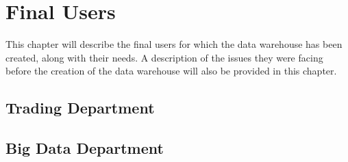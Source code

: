 \chapter{Final Users} \label{section:users}
    This chapter will describe the final users for which the data warehouse has been created, along with their needs.
    A description of the issues they were facing before the creation of the data warehouse will also be provided in this chapter.
    
    \section{Trading Department}
        
        
    \section{Big Data Department}
        
    